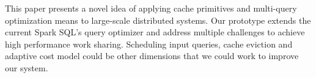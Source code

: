 This paper presents a novel idea of applying cache primitives and multi-query optimization means to large-scale distributed systems. Our prototype extends the current Spark SQL's query optimizer and address multiple challenges to achieve high performance work sharing. Scheduling input queries, cache eviction and adaptive cost model could be other dimensions that we could work to improve our system.
